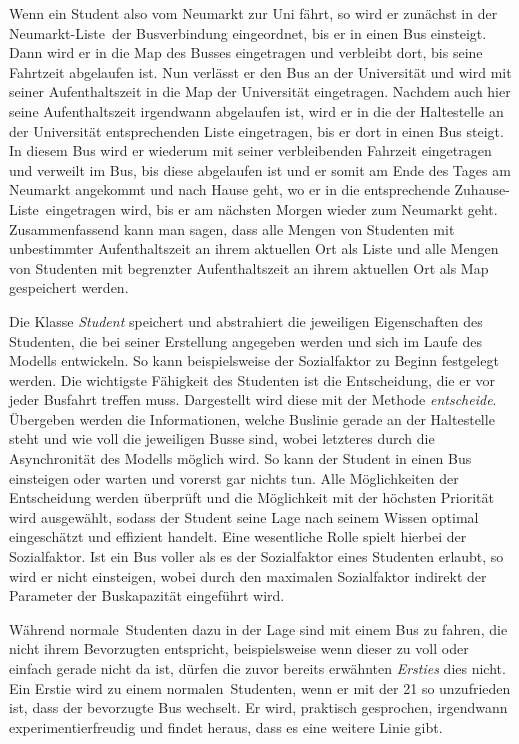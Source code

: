 \documentclass[12pt,a4paper]{scrartcl}
\begin{document}
Wenn ein Student also vom Neumarkt zur Uni fährt, so wird er zunächst in der \glqq Neumarkt-Liste\grqq~der Busverbindung eingeordnet, bis er in einen Bus einsteigt. Dann wird er in die Map des Busses eingetragen und verbleibt dort, bis seine Fahrtzeit abgelaufen ist. Nun verlässt er den Bus an der Universität und wird mit seiner Aufenthaltszeit in die Map der Universität eingetragen. Nachdem auch hier seine Aufenthaltszeit irgendwann abgelaufen ist, wird er in die der Haltestelle an der Universität entsprechenden Liste eingetragen, bis er dort in einen Bus steigt. In diesem Bus wird er wiederum mit seiner verbleibenden Fahrzeit eingetragen und verweilt im Bus, bis diese abgelaufen ist und er somit am Ende des Tages am Neumarkt angekommt und nach Hause geht, wo er in die entsprechende \glqq Zuhause-Liste\grqq~eingetragen wird, bis er am nächsten Morgen wieder zum Neumarkt geht. Zusammenfassend kann man sagen, dass alle Mengen von Studenten mit unbestimmter Aufenthaltszeit an ihrem aktuellen Ort als Liste und alle Mengen von Studenten mit begrenzter Aufenthaltszeit an ihrem aktuellen Ort als Map gespeichert werden.

Die Klasse \textit{Student} speichert und abstrahiert die jeweiligen Eigenschaften des Studenten, die bei seiner Erstellung angegeben werden und sich im Laufe des Modells entwickeln. So kann beispielsweise der Sozialfaktor zu Beginn festgelegt werden. Die wichtigste Fähigkeit des Studenten ist die Entscheidung, die er vor jeder Busfahrt treffen muss. Dargestellt wird diese mit der Methode \textit{entscheide}. Übergeben werden die Informationen, welche Buslinie gerade an der Haltestelle steht und wie voll die jeweiligen Busse sind, wobei letzteres durch die Asynchronität des Modells möglich wird. So kann der Student in einen Bus einsteigen oder warten und vorerst gar nichts tun. Alle Möglichkeiten der Entscheidung werden überprüft und die Möglichkeit mit der höchsten Priorität wird ausgewählt, sodass der Student seine Lage nach seinem Wissen optimal eingeschätzt und effizient handelt. 
Eine wesentliche Rolle spielt hierbei der Sozialfaktor. Ist ein Bus voller als es der Sozialfaktor eines Studenten erlaubt, so wird er nicht einsteigen, wobei durch den maximalen Sozialfaktor indirekt der Parameter der Buskapazität eingeführt wird.

Während \glqq normale\grqq~Studenten dazu in der Lage sind mit einem Bus zu fahren, die nicht ihrem Bevorzugten entspricht, beispielsweise wenn dieser zu voll oder einfach gerade nicht da ist, dürfen die zuvor bereits erwähnten \textit{Ersties} dies nicht. Ein Erstie wird zu einem \glqq normalen\grqq~Studenten, wenn er mit der 21 so unzufrieden ist, dass der bevorzugte Bus wechselt. Er wird, praktisch gesprochen, irgendwann experimentierfreudig und findet heraus, dass es eine weitere Linie gibt.
\end{document}
